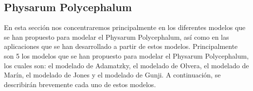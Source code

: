 \subsection{Physarum Polycephalum}
\label{sub:PhysarumArte}
    En esta secci\'on nos concentraremos principalmente en los diferentes modelos que se han propuesto para modelar el 
        Physarum Polycephalum, as\'i como en las aplicaciones que se han desarrollado a partir de estos modelos.
        Principalmente son 5 los modelos que se han propuesto para modelar el Physarum Polycephalum, los cuales son:
        el modelado de Adamatzky, el modelado de Olvera, el modelado de Mar\'in, el modelado de Jones y el modelado de
        Gunji. A continuaci\'on, se describir\'an brevemente cada uno de estos modelos.
    
    
    
    
    